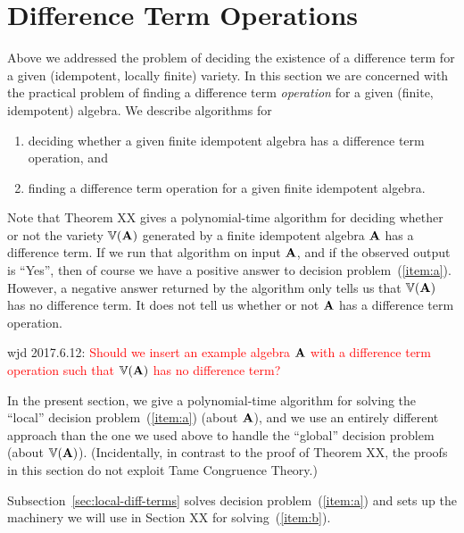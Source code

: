 \section{Difference Term Operations}
Above we addressed the problem of deciding the existence of a difference term 
for a given (idempotent, locally finite) variety.  In this section we are 
concerned with the practical problem of finding a difference term 
\emph{operation} for a given (finite, idempotent) algebra.
We describe algorithms for
\begin{enumerate}
\item \label{item:a} deciding whether a given finite idempotent algebra 
has a difference term operation, and 
\item \label{item:b} finding a difference term operation 
for a given finite idempotent algebra.
\end{enumerate}
Note that Theorem XX gives a polynomial-time algorithm
for deciding whether or not the variety $\operatorname{\mathbb{V}}(\mathbf{A})$ generated by a 
finite idempotent algebra $\mathbf{A}$ has a difference term.
If we run that algorithm on input $\mathbf{A}$, and if the observed
output is ``Yes'', then of course we have a positive answer to decision 
problem~(\ref{item:a}).  However, a negative answer returned by the 
algorithm only tells us that $\operatorname{\mathbb{V}}(\mathbf{A})$ has no difference term.  
It does not tell us whether or not $\mathbf{A}$ has a difference term operation.

\medskip

\noindent wjd 2017.6.12: \textcolor{red}{Should we insert an example algebra
$\mathbf{A}$ with a difference term operation such that $\operatorname{\mathbb{V}}(\mathbf{A})$ has no difference term?}

\medskip

In the present section, we give a polynomial-time algorithm for solving 
the ``local'' decision problem~(\ref{item:a}) (about $\mathbf{A}$), and we use 
an entirely different approach than the one we used above to handle 
the ``global'' decision problem (about $\operatorname{\mathbb{V}}(\mathbf{A})$).
(Incidentally, in contrast to the proof of Theorem XX, 
the proofs in this section do not exploit Tame Congruence Theory.)  

Subsection~\ref{sec:local-diff-terms} solves decision 
problem~(\ref{item:a}) and sets up the machinery we will use in Section XX for solving~(\ref{item:b}).


